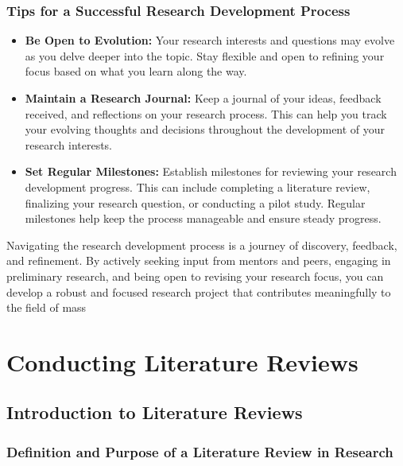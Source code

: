 \documentclass[
]{book}
\begin{document}
\hypertarget{tips-for-a-successful-research-development-process}{%
\subsection*{Tips for a Successful Research Development Process}\label{tips-for-a-successful-research-development-process}}

\begin{itemize}
\item
  \textbf{Be Open to Evolution:} Your research interests and questions may evolve as you delve deeper into the topic. Stay flexible and open to refining your focus based on what you learn along the way.
\item
  \textbf{Maintain a Research Journal:} Keep a journal of your ideas, feedback received, and reflections on your research process. This can help you track your evolving thoughts and decisions throughout the development of your research interests.
\item
  \textbf{Set Regular Milestones:} Establish milestones for reviewing your research development progress. This can include completing a literature review, finalizing your research question, or conducting a pilot study. Regular milestones help keep the process manageable and ensure steady progress.
\end{itemize}

Navigating the research development process is a journey of discovery, feedback, and refinement. By actively seeking input from mentors and peers, engaging in preliminary research, and being open to revising your research focus, you can develop a robust and focused research project that contributes meaningfully to the field of mass

\hypertarget{conducting-literature-reviews}{%
\chapter{Conducting Literature Reviews}\label{conducting-literature-reviews}}

\hypertarget{introduction-to-literature-reviews}{%
\section{Introduction to Literature Reviews}\label{introduction-to-literature-reviews}}

\hypertarget{definition-and-purpose-of-a-literature-review-in-research}{%
\subsection*{Definition and Purpose of a Literature Review in Research}\label{definition-and-purpose-of-a-literature-review-in-research}}
\end{document}
